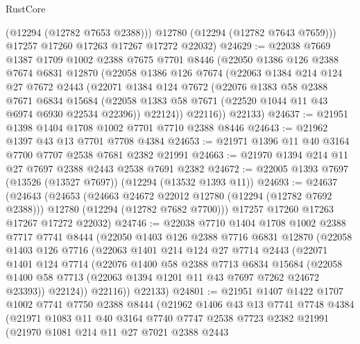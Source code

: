 \begin{lexlean}{RustCore}
\begin{coremodule}
          (@12294 (@12782 @7653 @2388)))
        @12780
        (@12294 (@12782 @7643 @7659)))
      @17257
      @17260
      @17263
      @17267
      @17272
      @22032)
@24629 := @22038
    @7669
    @1387
    @1709
    @1002
    @2388
    @7675
    @7701
    @8446
    (@22050
      @1386
      @126
      @2388
      @7674
      @6831
      @12870
      (@22058
        @1386
        @126
        @7674
        (@22063
          @1384
          @214
          @124
          @27
          @7672
          @2443
          (@22071
            @1384
            @124
            @7672
            (@22076
              @1383
              @58
              @2388
              @7671
              @6834
              @15684
              (@22058 @1383 @58 @7671 (@22520 @1044 @11 @43 @6974 @6930 @22534 @22396))
              @22124))
          @22116))
      @22133)
@24637 := @21951 @1398 @1404 @1708 @1002 @7701 @7710 @2388 @8446
@24643 := @21962 @1397 @43 @13 @7701 @7708 @4384
@24653 := @21971 @1396 @11 @40 @3164 @7700 @7707 @2538 @7681 @2382 @21991
@24663 := @21970 @1394 @214 @11 @27 @7697 @2388 @2443 @2538 @7691 @2382
@24672 := @22005 @1393 @7697 (@13526 (@13527 @7697)) (@12294 (@13532 @1393 @11))
@24693 := @24637
    (@24643
      (@24653
        (@24663 @24672 @22012 @12780 (@12294 (@12782 @7692 @2388)))
        @12780
        (@12294 (@12782 @7682 @7700)))
      @17257
      @17260
      @17263
      @17267
      @17272
      @22032)
@24746 := @22038
    @7710
    @1404
    @1708
    @1002
    @2388
    @7717
    @7741
    @8444
    (@22050
      @1403
      @126
      @2388
      @7716
      @6831
      @12870
      (@22058
        @1403
        @126
        @7716
        (@22063
          @1401
          @214
          @124
          @27
          @7714
          @2443
          (@22071
            @1401
            @124
            @7714
            (@22076
              @1400
              @58
              @2388
              @7713
              @6834
              @15684
              (@22058 @1400 @58 @7713 (@22063 @1394 @1201 @11 @43 @7697 @7262 @24672 @23393))
              @22124))
          @22116))
      @22133)
@24801 := @21951
    @1407
    @1422
    @1707
    @1002
    @7741
    @7750
    @2388
    @8444
    (@21962
      @1406
      @43
      @13
      @7741
      @7748
      @4384
      (@21971
        @1083
        @11
        @40
        @3164
        @7740
        @7747
        @2538
        @7723
        @2382
        @21991
        (@21970
          @1081
          @214
          @11
          @27
          @7021
          @2388
          @2443

\end{coremodule}
\end{lexlean}

